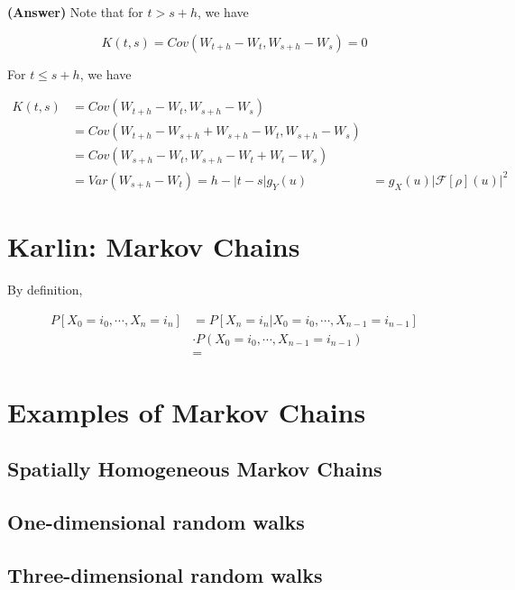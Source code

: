\documentclass[12pt]{article}
\theoremstyle{nonumberbreak}
\begin{document}
\textbf{(Answer)} Note that for $t > s + h$, we have

$$
K(t,s) = Cov(W_{t+h} - W_t, W_{s+h} - W_s) = 0
$$

For $t \le s + h$, we have

$$
\begin{aligned}
K(t,s) &= Cov(W_{t+h} - W_t, W_{s+h} - W_s) \\[8pt]
&= Cov(W_{t+h} - W_{s+h} + W_{s+h} - W_t, W_{s+h} - W_s) \\[8pt]
&= Cov(W_{s+h} - W_t, W_{s+h} - W_t + W_t - W_s) \\[8pt]
&= Var(W_{s+h} - W_t) = h - |t - s|
g_Y(u) &= g_X(u) |\mathcal{F}[\rho] (u)|^2
\end{aligned}
$$






\pagebreak
\section*{Karlin: Markov Chains}
\setcounter{section}{0}


By definition, 


$$
\begin{aligned}
P\left[ X_0 = i_0, \cdots, X_n = i_n \right] &= P[X_n = i_n | X_0 = i_0, \cdots, X_{n-1} = i_{n-1}] \\[8pt]
&\cdot P(X_0 = i_0, \cdots, X_{n-1} = i_{n-1}) \\[8pt]
&= 
\end{aligned}
$$


\section{Examples of Markov Chains}

\subsection{Spatially Homogeneous Markov Chains}


\subsection{One-dimensional random walks}




\subsection{Three-dimensional random walks}
\end{document}
